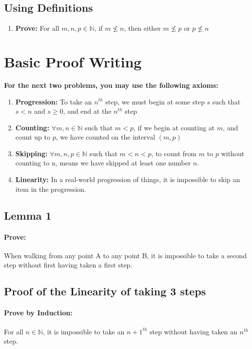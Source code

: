 \documentclass[12pt]{article}
\begin{document}
		\subsection{Using Definitions}
		\begin{enumerate}[resume]
			\item \textbf{Prove: } For all $ m,n,p\in\mathbb{N}$, if $m\nleq n$, then either $m\nleq p$ or $p \nleq n$
		\end{enumerate}
		\newpage
	\section{Basic Proof Writing}
		\textbf{For the next two problems, you may use the following axioms:}
		\begin{enumerate}
			\item \textbf{Progression: } To take an $n^{th}$ step, we must begin at some step $s$ such that $s<n$ and $s\geq 0$, and end at the $n^{th}$ step
			\item \textbf{Counting: } $\forall m,n\in\mathbb{N}$ such that $m<p$, if we begin at counting at $m$, and count up to $p$, we have counted on the interval $(m,p)$
			\item\textbf{Skipping: } $\forall m,n,p\in\mathbb{N}$ such that $m<n<p$, to count from $m$ to $p$ without counting to n, means we have skipped at least one number $n$.
			\item\textbf{Linearity: } In a real-world progression of things, it is impossible to skip an item in the progression.
		\end{enumerate}
		\subsection{Lemma 1}
		\paragraph{Prove:} When walking from any point A to any point B, it is impossible to take a second step without first having taken a first step.
		\subsection{Proof of the Linearity of taking 3 steps}
		\paragraph{Prove by Induction:} For all $ n\in\mathbb{N}$, it is impossible to take an $n+1^{th}$ step without having taken an $n^{th}$ step.\newline
\end{document}
